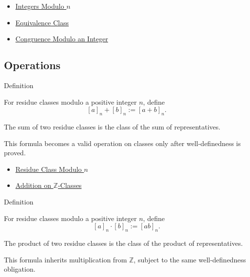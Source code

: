\begin{dependencies}
\begin{itemize}
  \item \hyperref[def:integers-modulo-n]{Integers Modulo \(n\)}
  \item \hyperref[def:equiv-class]{Equivalence Class}
  \item \hyperref[def:congruence-modulo-integer]{Congruence Modulo an Integer}
\end{itemize}
\end{dependencies}

\subsection*{Operations}

\begin{definitionbox}{Definition}
\begin{definition}
\label{def:addition-modulo-n}
For residue classes modulo a positive integer \(n\), define
\[
[a]_n+[b]_n:=[a+b]_n.
\]
\end{definition}

\begin{remark*}
The sum of two residue classes is the class of the sum of representatives.
\end{remark*}

\begin{remark*}[Interpretation]
This formula becomes a valid operation on classes only after well-definedness
is proved.
\end{remark*}
\end{definitionbox}

\begin{dependencies}
\begin{itemize}
  \item \hyperref[def:residue-class-modulo-n]{Residue Class Modulo \(n\)}
  \item \hyperref[def:addition-on-z-classes]{Addition on \(\mathbb{Z}\)-Classes}
\end{itemize}
\end{dependencies}

\begin{definitionbox}{Definition}
\begin{definition}
\label{def:multiplication-modulo-n}
For residue classes modulo a positive integer \(n\), define
\[
[a]_n\cdot[b]_n:=[ab]_n.
\]
\end{definition}

\begin{remark*}
The product of two residue classes is the class of the product of
representatives.
\end{remark*}

\begin{remark*}[Interpretation]
This formula inherits multiplication from \(\mathbb{Z}\), subject to the same
well-definedness obligation.
\end{remark*}
\end{definitionbox}

